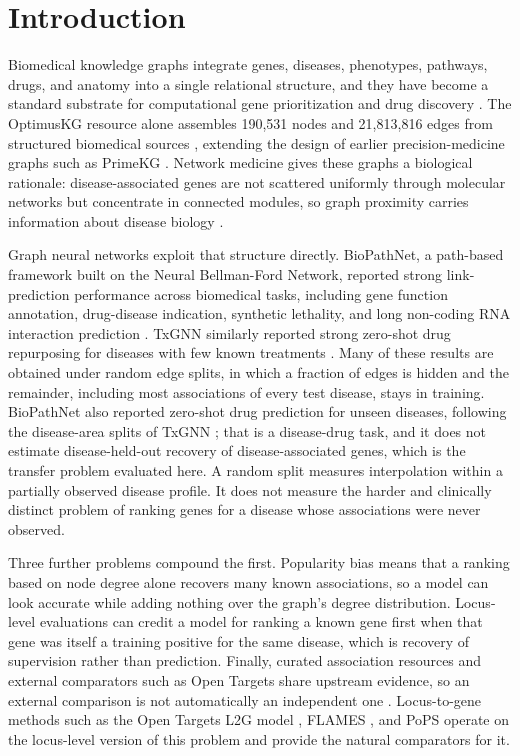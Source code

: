 \documentclass[11pt]{article}
\begin{document}
\section{Introduction}

Biomedical knowledge graphs integrate genes, diseases, phenotypes, pathways, drugs, and anatomy into a single relational structure, and they have become a standard substrate for computational gene prioritization and drug discovery \cite{vittor2026,chandak2023}. The OptimusKG resource alone assembles 190,531 nodes and 21,813,816 edges from structured biomedical sources \cite{vittor2026}, extending the design of earlier precision-medicine graphs such as PrimeKG \cite{chandak2023}. Network medicine gives these graphs a biological rationale: disease-associated genes are not scattered uniformly through molecular networks but concentrate in connected modules, so graph proximity carries information about disease biology \cite{menche2015,himmelstein2017}.

Graph neural networks exploit that structure directly. BioPathNet, a path-based framework built on the Neural Bellman-Ford Network, reported strong link-prediction performance across biomedical tasks, including gene function annotation, drug-disease indication, synthetic lethality, and long non-coding RNA interaction prediction \cite{hu2026,zhu2021}. TxGNN similarly reported strong zero-shot drug repurposing for diseases with few known treatments \cite{huang2024}. Many of these results are obtained under random edge splits, in which a fraction of edges is hidden and the remainder, including most associations of every test disease, stays in training. BioPathNet also reported zero-shot drug prediction for unseen diseases, following the disease-area splits of TxGNN \cite{huang2024}; that is a disease-drug task, and it does not estimate disease-held-out recovery of disease-associated genes, which is the transfer problem evaluated here. A random split measures interpolation within a partially observed disease profile. It does not measure the harder and clinically distinct problem of ranking genes for a disease whose associations were never observed.

Three further problems compound the first. Popularity bias means that a ranking based on node degree alone recovers many known associations, so a model can look accurate while adding nothing over the graph's degree distribution. Locus-level evaluations can credit a model for ranking a known gene first when that gene was itself a training positive for the same disease, which is recovery of supervision rather than prediction. Finally, curated association resources and external comparators such as Open Targets share upstream evidence, so an external comparison is not automatically an independent one \cite{ochoa2021,ghoussaini2021}. Locus-to-gene methods such as the Open Targets L2G model \cite{mountjoy2021}, FLAMES \cite{schipper2025}, and PoPS \cite{weeks2023} operate on the locus-level version of this problem and provide the natural comparators for it.
\end{document}
